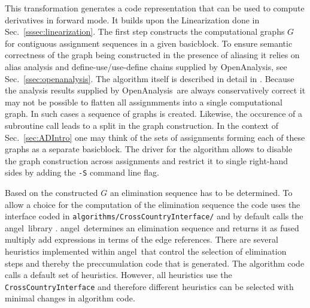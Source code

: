 \documentclass[11pt]{article}
\newcommand{\angel}{angel}
\newcommand{\basicblock}{basicblock}
\newcommand{\OpenAnalysis}{OpenAnalysis}
\newcommand{\code}[1]{{\small\tt{#1}}}
\newcommand{\refsec}[1]{{Sec.~\ref{#1}}}
\begin{document}
This transformation generates a code representation that can be used 
to compute derivatives in forward mode. It builds upon the Linearization
done in \refsec{sssec:linearization}. 
The first step constructs the 
computational graphs $G$ 
for contiguous 
assignment sequences in a given \basicblock. To ensure semantic 
correctness of the graph being constructed in the presence of 
aliasing it relies on alias analysis and define-use/use-define chains 
supplied by \OpenAnalysis, see \refsec{ssec:openanalysis}.
The algorithm itself is described in detail in \cite{Utk04FBB}.
Because the analysis results supplied by \OpenAnalysis\ are always 
conservatively correct it may not be possible to flatten all 
assignmments into a single computational graph. In such cases 
a sequence of graphs is created. Likewise, the occurence 
of a subroutine call leads to a split in the graph construction. 
In the context of \refsec{sec:ADIntro} one may think of the sets of 
assignments forming each of these graphs as a separate \basicblock. 
The driver for the algorithm allows to disable 
the graph construction across assignments and restrict it to 
single right-hand sides by adding the \code{-S} command 
line flag. 

Based on the constructed $G$ an elimination sequence has to be determined.
To allow a choice for the computation of the elimination sequence 
the code uses the interface coded in \code{algorithms/CrossCountryInterface/}
and by default calls the \angel\ library \cite{angelWeb,AGN03,SAGA}.
\angel\ determines an elimination sequence and returns it as 
fused multiply add expressions in terms of the edge references.
There are several heuristics implemented within \angel\ that control 
the selection of elimination steps and thereby the preccumulation code 
that is generated.  The algorithm code calls a default set of heuristics. 
However, all heuristics use the \code{CrossCountryInterface} and therefore 
different heuristics can be selected with minimal changes in algorithm code.   
\end{document}
